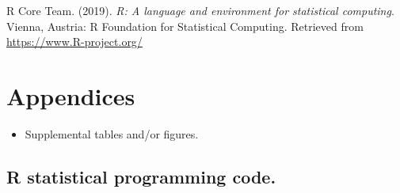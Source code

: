 \documentclass[man]{apa6}
\providecommand{\tightlist}{%
  \setlength{\itemsep}{0pt}\setlength{\parskip}{0pt}}
\begin{document}
\leavevmode\hypertarget{ref-R-base}{}%
R Core Team. (2019). \emph{R: A language and environment for statistical computing}. Vienna, Austria: R Foundation for Statistical Computing. Retrieved from \url{https://www.R-project.org/}

\endgroup

\newpage

\hypertarget{appendices}{%
\section{Appendices}\label{appendices}}

\begin{itemize}
\tightlist
\item
  Supplemental tables and/or figures.
\end{itemize}

\hypertarget{r-statistical-programming-code.}{%
\subsection{R statistical programming code.}\label{r-statistical-programming-code.}}
\end{document}
